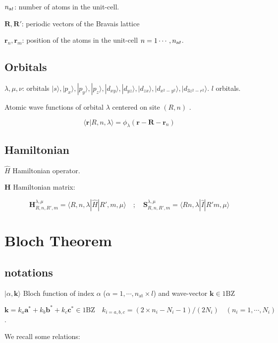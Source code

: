 \documentclass{article}
\newcommand{\bra}[1]{\langle #1|}
\newcommand{\ket}[1]{|#1\rangle}
\newcommand{\braket}[2]{\langle #1|#2\rangle}
\newcommand{\op}[1]{\hat{#1}}
\begin{document}
\noindent
$n_{\text at}$: number of atoms in the unit-cell.

\noindent
$\mathbf{R}, \mathbf{R}'$: periodic vectors of the Bravais lattice

\noindent $\mathbf{r}_n,\mathbf{r}_m$: position of the atoms in the unit-cell $n=1\cdots, n_{\text at}$.


\subsection{Orbitals}

\noindent
$\lambda, \mu, \nu$: orbitals 
$\ket{s},\ket{p_x},\ket{p_y},\ket{p_z},
\ket{d_{xy}},\ket{d_{yz}},\ket{d_{zx}},\ket{d_{x^2-y^2}},\ket{d_{3z^2-r^2}}$. $l$ orbitals.

\noindent
Atomic wave functions of orbital $\lambda$ centered on site $(R,n)$ .

\[\braket{\mathbf{r}}{R,n,\lambda} = \phi_{\lambda}(\mathbf{r}-\mathbf{R}-\mathbf{r}_n)\]




\subsection{Hamiltonian}

\noindent
$\op{H}$ Hamiltonian operator.

\noindent
$\bm{H}$ Hamiltonian matrix:

\noindent
\[ \displaystyle \bm{H}_{R,n,R',m}^{\lambda, \mu}=\bra{ R,n,\lambda} \op{H} \ket{ R',m,\mu } \quad ;\quad
\bm{S}_{R,n,R',m}^{\lambda, \mu}=\bra{ Rn,\lambda} \op{I} \ket{R' m,\mu }\]


\section{Bloch Theorem}

\subsection{notations}

\noindent $\ket{\alpha, \mathbf{k} }$  Bloch function of index
$\alpha$ ($\alpha=1, \cdots, n_{\text{at}} \times l$) and wave-vector $\mathbf{k}\in \text{1BZ}$


\noindent
  $ \mathbf{k}=  k_a \mathbf{a}^*+k_b \mathbf{b}^*+k_c \mathbf{c}^* \in \mbox{1BZ}
\quad k_{i=a,b,c}= (2\times n_i -N_i -1)/(2 N_i) \quad (n_i=1,\cdots,N_i)$ .

\noindent
We recall some relations:
\end{document}
